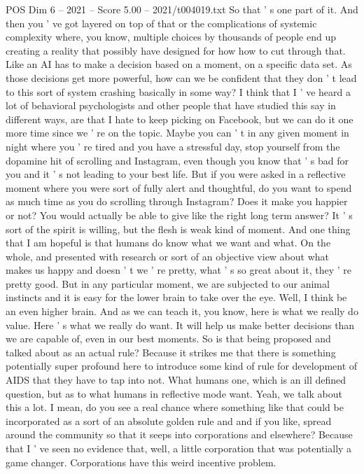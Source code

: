 \begin{textsample}{POS Dim 6 – 2021 – Score 5.00 – 2021/t004019.txt}
So that ' s one part of it.
And then you ' ve got layered on top of that or the complications of systemic complexity where, you know, multiple choices by thousands of people end up creating a reality that possibly have designed for how how to cut through that.
Like an AI has to make a decision based on a moment, on a specific data set.
As those decisions get more powerful, how can we be confident that they don ' t lead to this sort of system crashing basically in some way?
I think that I ' ve heard a lot of behavioral psychologists and other people that have studied this say in different ways, are that I hate to keep picking on Facebook, but we can do it one more time since we ' re on the topic.
Maybe you can ' t in any given moment in night where you ' re tired and you have a stressful day, stop yourself from the dopamine hit of scrolling and Instagram, even though you know that ' s bad for you and it ' s not leading to your best life.
But if you were asked in a reflective moment where you were sort of fully alert and thoughtful, do you want to spend as much time as you do scrolling through Instagram?
Does it make you happier or not?
You would actually be able to give like the right long term answer?
It ' s sort of the spirit is willing, but the flesh is weak kind of moment.
And one thing that I am hopeful is that humans do know what we want and what.
On the whole, and presented with research or sort of an objective view about what makes us happy and doesn ' t we ' re pretty, what ' s so great about it, they ' re pretty good.
But in any particular moment, we are subjected to our animal instincts and it is easy for the lower brain to take over the eye.
Well, I think be an even higher brain.
And as we can teach it, you know, here is what we really do value.
Here ' s what we really do want.
It will help us make better decisions than we are capable of, even in our best moments.
So is that being proposed and talked about as an actual rule?
Because it strikes me that there is something potentially super profound here to introduce some kind of rule for development of AIDS that they have to tap into not.
What humans one, which is an ill defined question, but as to what humans in reflective mode want.
Yeah, we talk about this a lot.
I mean, do you see a real chance where something like that could be incorporated as a sort of an absolute golden rule and and if you like, spread around the community so that it seeps into corporations and elsewhere?
Because that I ' ve seen no evidence that, well, a little corporation that was potentially a game changer.
Corporations have this weird incentive problem.

\end{textsample}
